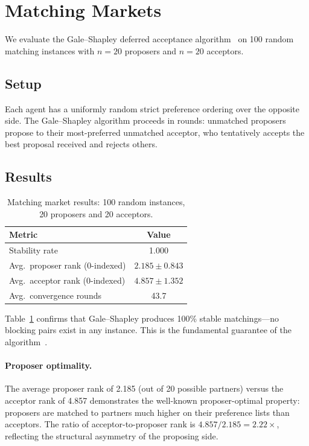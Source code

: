 \documentclass[10pt]{article}
\begin{document}
\section{Matching Markets}
\label{sec:matching}

We evaluate the Gale--Shapley deferred acceptance algorithm~\citep{gale1962college} on 100 random matching instances with $n=20$ proposers and $n=20$ acceptors.

\subsection{Setup}

Each agent has a uniformly random strict preference ordering over the opposite side. The Gale--Shapley algorithm proceeds in rounds: unmatched proposers propose to their most-preferred unmatched acceptor, who tentatively accepts the best proposal received and rejects others.

\subsection{Results}

\begin{table}[t]
\centering
\caption{Matching market results: 100 random instances, 20 proposers and 20 acceptors.}
\label{tab:matching}
\begin{tabular}{lc}
\toprule
\textbf{Metric} & \textbf{Value} \\
\midrule
Stability rate & 1.000 \\
Avg.\ proposer rank (0-indexed) & $2.185 \pm 0.843$ \\
Avg.\ acceptor rank (0-indexed) & $4.857 \pm 1.352$ \\
Avg.\ convergence rounds & 43.7 \\
\bottomrule
\end{tabular}
\end{table}

Table~\ref{tab:matching} confirms that Gale--Shapley produces 100\% stable matchings---no blocking pairs exist in any instance. This is the fundamental guarantee of the algorithm~\citep{gale1962college}.

\paragraph{Proposer optimality.}
The average proposer rank of 2.185 (out of 20 possible partners) versus the acceptor rank of 4.857 demonstrates the well-known proposer-optimal property: proposers are matched to partners much higher on their preference lists than acceptors. The ratio of acceptor-to-proposer rank is $4.857/2.185 = 2.22\times$, reflecting the structural asymmetry of the proposing side.
\end{document}
